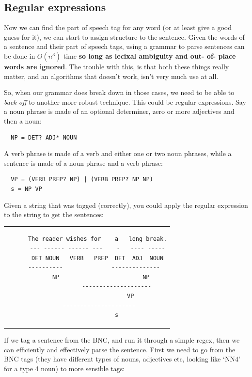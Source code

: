 \subsection{Regular expressions}

Now we can find the part of speech tag for any word (or at least give a good
guess for it), we can start to assign structure to the sentence. Given the words
of a sentence and their part of speech tags, using a grammar to parse sentences
can be done in $O(n^3)$ time \textbf{so long as lecixal ambiguity and out- of-
place words are ignored}. The trouble with this, is that both these things
really matter, and an algorithms that doesn't work, isn't very much use at all.

So, when our grammar does break down in those cases, we need to be able to
\textit{back off} to another more robust technique. This could be regular
expressions. Say a noun phrase is made of an optional determiner, zero or more
adjectives and then a noun:

\begin{verbatim}
  NP = DET? ADJ* NOUN
\end{verbatim}

A verb phrase is made of a verb and either one or two noun phrases, while a
sentence is made of a noun phrase and a verb phrase:

\begin{verbatim}
  VP = (VERB PREP? NP) | (VERB PREP? NP NP)
  s = NP VP
\end{verbatim}

Given a string that was tagged (correctly), you could apply the regular
expression to the string to get the sentences:

\begin{center}
  \begin{tabular}{c}
    \begin{lstlisting}
      The reader wishes for    a   long break.
      --- ------ ------ ---    -   ---- -----
      DET NOUN   VERB   PREP  DET  ADJ  NOUN
      ----------              --------------  
        NP                        NP
                 --------------------
                         VP
       ---------------------
                 s
    \end{lstlisting}
  \end{tabular}
\end{center}

If we tag a sentence from the BNC, and run it through a simple regex, then we
can efficiently and effectively parse the sentence. First we need to go from the
BNC tags (they have different types of nouns, adjectives etc, looking like `NN4'
for a type 4 noun) to more sensible tags:

